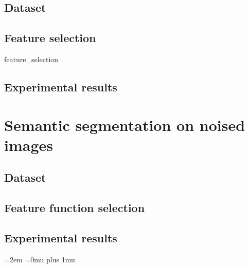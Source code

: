 \documentclass[12pt]{report}
\begin{document}
    \subsection{Dataset}

    \subsection{Feature selection}
    {feature_selection}
    
    \subsection{Experimental results}	
    

\section{Semantic segmentation on noised images}
    \subsection{Dataset}
    
    \subsection{Feature function selection}
    
    \subsection{Experimental results}	





\newpage
\emergencystretch=2em
\Urlmuskip=0mu plus 1mu\relax
\printbibliography 
\end{document}
